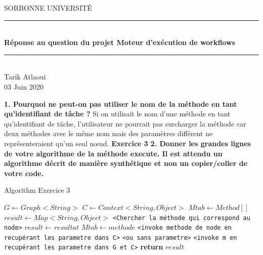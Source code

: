 \documentclass{article}
\date{\today}
\author{Tarik Atlaoui}
\begin{document}
\makeatletter
\def\BState{\State\hskip-\ALG@thistlm}
\makeatother

\begin{titlepage}
	\enlargethispage{2cm}
	\newcommand{\HRule}{\rule{\linewidth}{0.5mm}}
	\center
	\textsc{\LARGE
	SORBONNE UNIVERSITÉ 
	} \\[1cm]
	\HRule \\[0.4cm]
	{ \huge \bfseries Réponse au question du projet Moteur d’exécution de workflows \\[0.15cm] }
	\HRule \\[4cm]
	\large{Tarik Atlaoui} \\[3cm]
	03 Juin 2020 \\[3cm]

\end{titlepage}
                                                                                                                         
\textbf{1. Pourquoi ne peut-on pas utiliser le nom de la méthode en tant qu’identifiant de tâche ?}
\newline
\newline
Si on utilisait le nom d'une méthode en tant qu'identifiant de tâche,
 l'utilisateur ne pourrait pas surcharger la méthode car deux méthodes avec le même nom mais
  des paramètres différent ne représenteraient qu'un seul nœud. 
\newline
\newline
\textbf{Exercice 3}
\newline
\textbf{2. Donner les grandes lignes de votre algorithme de la méthode execute. Il est attendu un
algorithme décrit de manière synthétique et non un copier/coller de votre code.}

\begin{algorithm}
  \caption{Algorithm Exercice 3}\label{euclid}
  \begin{algorithmic}[1]
      \State $G\gets Graph<String>$
      \State $C\gets Context<String , Object>$
      \State $Mtab\gets Method[]$
      \State $result\gets Map<String , Object>$
        \State \texttt{<Chercher la méthode qui correspond au node>}      
          \State $result\gets resultat$
          \State $Mtab\gets methode$
        \Else 
        \State \texttt{<invoke methode de node en recupérant les parametre dans C>}
        \State \texttt{<ou sans parametre>}
        \EndIf  
        \EndFor
        \State 
       
        \State \texttt{<invoke m en recupérant les parametre dans G et C>}
      \EndFor
      \State \textbf{return} $result$
    \EndProcedure
  \end{algorithmic}
\end{algorithm}
\end{document}
